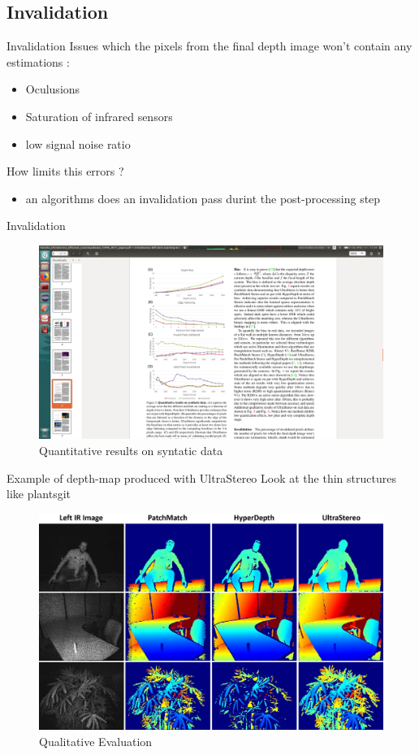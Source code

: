 \documentclass{beamer}
\begin{document}
\subsection{Invalidation}
\begin{frame}{Invalidation}
Issues which the pixels from the final depth image won't contain any estimations :
\begin{itemize}
\item Oculusions
\item Saturation of infrared sensors
\item low signal noise ratio
\end{itemize}
How limits this errors ?
\begin{itemize}
\item an algorithms does an invalidation pass durint the post-processing step
\end{itemize}
\end{frame}

\begin{frame}{Invalidation}
\begin{figure}
\includegraphics[scale=0.06]{pictures/fig3}
\caption{Quantitative results on syntatic data}
\end{figure}
\end{frame}

\begin{frame}{Example of depth-map produced with UltraStereo}
Look at the thin structures like plantsgit
\begin{figure}
\includegraphics[scale=0.08]{pictures/fig5}
\caption{Qualitative Evaluation}
\end{figure}
\end{frame}
\end{document}
